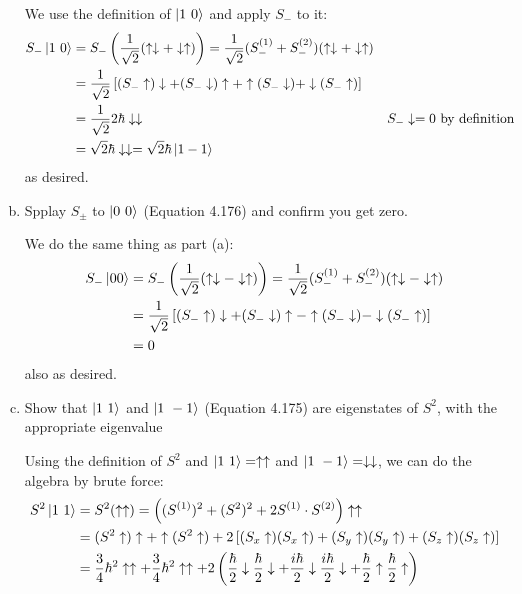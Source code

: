 \documentclass[10pt]{article}
\newcommand{\ud}{\uparrow \downarrow}
\newcommand{\du}{\downarrow \uparrow}
\newcommand{\uu}{\uparrow \uparrow}
\renewcommand{\dd}{\downarrow \downarrow}
\newcommand{\ua}{\uparrow}
\newcommand{\da}{\downarrow}
\begin{document}
\begin{enumerate}[(a)]
        \begin{solution}
            We use the definition of $\ket{1 \ 0}$ and apply $S_-$ to it:
                \begin{align*}
                    S_{-}\ket{1 \ 0} &= S_{-}\left(\frac{1}{\sqrt2}(\ud + \du)\right) = \frac{1}{\sqrt2}(S_{-}^{(1)} + S_{-}^{(2)})(\ud + \du)\\
                    &= \frac{1}{\sqrt2}\left[(S_{-}\ua)\da + (S_{-}\da)\ua + \ua(S_{-}\da) + \da(S_{-}\ua)\right]\\
                    &= \frac{1}{\sqrt2}2\hbar\dd && S_- \da = 0 \text{ by definition}\\
                    &= \sqrt{2}\hbar\dd = \sqrt2\hbar\ket{1 -1}
                \end{align*}
                as desired.
        \end{solution}
        \item Spplay $S_\pm$ to $\ket{0 \ 0}$ (Equation 4.176) and confirm you get zero. 
        \begin{solution}
            We do the same thing as part (a):
                \begin{align*}
                    S_{-}\ket{0 0} &= S_{-}\left(\frac{1}{\sqrt2}(\ud - \du)\right) = \frac{1}{\sqrt2}(S_{-}^{(1)} + S_{-}^{(2)})(\ud - \du)\\
                    &= \frac{1}{\sqrt2}\left[(S_{-}\ua)\da + (S_{-}\da)\ua - \ua(S_{-}\da) - \da(S_{-}\ua)\right]\\
                    &= 0
                \end{align*}
                also as desired.
        \end{solution}
        \item Show that $\ket{1 \ 1}$ and $\ket{1 \ -1}$ (Equation 4.175) are eigenstates of $S^2$, with the appropriate eigenvalue
        \begin{solution}
            Using the definition of $S^2$ and $\ket{1 \ 1} = \uu$ and $\ket{1 \ -1} = \dd$, we can do the algebra by brute force:
                \begin{align*}
                    S^2\ket{1 \ 1} &= S^2(\uu) = \left((S^{(1)})^2 + (S^{2})^2 + 2S^{(1)}\cdot S^{(2)}\right)\uu \\ 
                    &= (S^2\ua)\ua + \ua(S^2\ua) + 2\left[(S_x\ua)(S_x\ua) + (S_y\ua)(S_y\ua) +(S_z\ua)(S_z\ua)\right] \\
                    &= \frac34\hbar^2\uu + \frac34\hbar^2\uu + 2\left(\frac{\hbar}{2}\da\frac{\hbar}{2}\da + \frac{i\hbar}{2}\da\frac{i\hbar}{2}\da + \frac{\hbar}{2}\ua\frac{\hbar}{2}\ua\right) \\

\end{align*}
\end{solution}
\end{enumerate}
\end{document}
